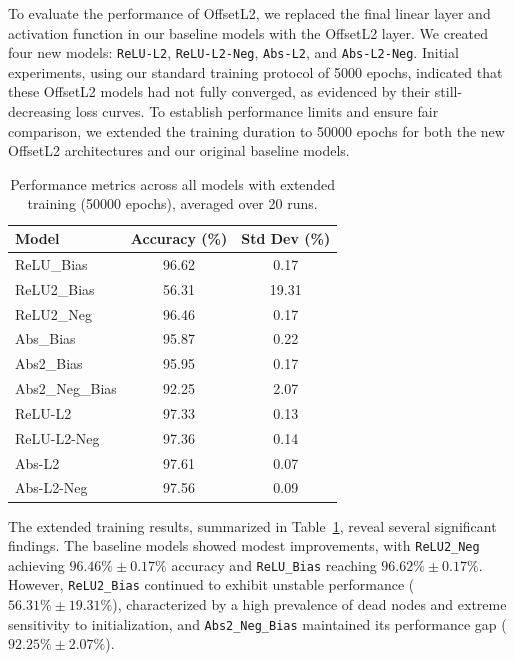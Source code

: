 To evaluate the performance of OffsetL2, we replaced the final linear layer and activation function in our baseline models with the OffsetL2 layer.  We created four new models: \texttt{ReLU-L2}, \texttt{ReLU-L2-Neg}, \texttt{Abs-L2}, and \texttt{Abs-L2-Neg}. Initial experiments, using our standard training protocol of 5000 epochs, indicated that these OffsetL2 models had not fully converged, as evidenced by their still-decreasing loss curves. To establish performance limits and ensure fair comparison, we extended the training duration to 50000 epochs for both the new OffsetL2 architectures and our original baseline models.

\begin{table}[H]
    \centering
    \footnotesize
    \begin{tabular}{lcc}
    \toprule
    \textbf{Model} & \textbf{Accuracy (\%)} & \textbf{Std Dev (\%)} \\
    \midrule
    ReLU\_Bias & 96.62 & 0.17 \\
    ReLU2\_Bias & 56.31 & 19.31 \\
    ReLU2\_Neg & 96.46 & 0.17 \\
    Abs\_Bias & 95.87 & 0.22 \\
    Abs2\_Bias & 95.95 & 0.17 \\
    Abs2\_Neg\_Bias & 92.25 & 2.07 \\
    \midrule
    ReLU-L2 & 97.33 & 0.13 \\
    ReLU-L2-Neg & 97.36 & 0.14 \\
    Abs-L2 & 97.61 & 0.07 \\
    Abs-L2-Neg & 97.56 & 0.09 \\
    \bottomrule
    \end{tabular}
    \caption{Performance metrics across all models with extended training (50000 epochs), averaged over 20 runs.}
    \label{tab:extended_training}
\end{table}

The extended training results, summarized in Table~\ref{tab:extended_training}, reveal several significant findings. The baseline models showed modest improvements, with \texttt{ReLU2\_Neg} achieving $96.46\% \pm 0.17\%$ accuracy and \texttt{ReLU\_Bias} reaching $96.62\% \pm 0.17\%$. However, \texttt{ReLU2\_Bias} continued to exhibit unstable performance ($56.31\% \pm 19.31\%$), characterized by a high prevalence of dead nodes and extreme sensitivity to initialization, and \texttt{Abs2\_Neg\_Bias} maintained its performance gap ($92.25\% \pm 2.07\%$).

